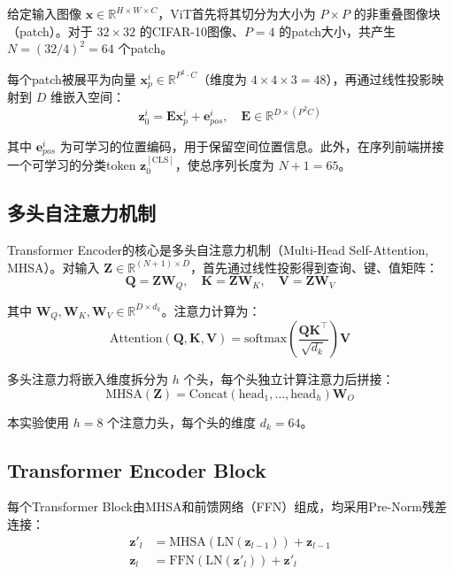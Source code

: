 \documentclass[12pt,a4paper]{article}
\begin{document}
给定输入图像 $\bm{x} \in \mathbb{R}^{H \times W \times C}$，ViT首先将其切分为大小为 $P \times P$ 的非重叠图像块（patch）。对于 $32 \times 32$ 的CIFAR-10图像、$P=4$ 的patch大小，共产生 $N = (32/4)^2 = 64$ 个patch。

每个patch被展平为向量 $\bm{x}_p^i \in \mathbb{R}^{P^2 \cdot C}$（维度为 $4 \times 4 \times 3 = 48$），再通过线性投影映射到 $D$ 维嵌入空间：
\begin{equation}
\bm{z}_0^i = \bm{E} \bm{x}_p^i + \bm{e}_{pos}^i, \quad \bm{E} \in \mathbb{R}^{D \times (P^2 C)}
\end{equation}

其中 $\bm{e}_{pos}^i$ 为可学习的位置编码，用于保留空间位置信息。此外，在序列前端拼接一个可学习的分类token $\bm{z}_0^{[\text{CLS}]}$，使总序列长度为 $N+1=65$。

\subsection{多头自注意力机制}

Transformer Encoder的核心是多头自注意力机制（Multi-Head Self-Attention, MHSA）。对输入 $\bm{Z} \in \mathbb{R}^{(N+1) \times D}$，首先通过线性投影得到查询、键、值矩阵：
\begin{equation}
\bm{Q} = \bm{Z}\bm{W}_Q, \quad \bm{K} = \bm{Z}\bm{W}_K, \quad \bm{V} = \bm{Z}\bm{W}_V
\end{equation}

其中 $\bm{W}_Q, \bm{W}_K, \bm{W}_V \in \mathbb{R}^{D \times d_k}$。注意力计算为：
\begin{equation}
\text{Attention}(\bm{Q}, \bm{K}, \bm{V}) = \text{softmax}\left(\frac{\bm{Q}\bm{K}^\top}{\sqrt{d_k}}\right)\bm{V}
\end{equation}

多头注意力将嵌入维度拆分为 $h$ 个头，每个头独立计算注意力后拼接：
\begin{equation}
\text{MHSA}(\bm{Z}) = \text{Concat}(\text{head}_1, \dots, \text{head}_h)\bm{W}_O
\end{equation}

本实验使用 $h=8$ 个注意力头，每个头的维度 $d_k = 64$。

\subsection{Transformer Encoder Block}

每个Transformer Block由MHSA和前馈网络（FFN）组成，均采用Pre-Norm残差连接：
\begin{align}
\bm{z}'_l &= \text{MHSA}(\text{LN}(\bm{z}_{l-1})) + \bm{z}_{l-1} \\
\bm{z}_l &= \text{FFN}(\text{LN}(\bm{z}'_l)) + \bm{z}'_l
\end{align}
\end{document}

